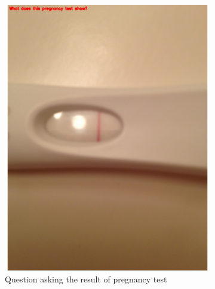 \documentclass[sigconf]{acmart}
\begin{document}
\begin{figure}[hbp]
\begin{subfigure}[b]{0.3\columnwidth}
                \includegraphics[width=\textwidth]{images/health_2.pdf}
                \caption{Question asking the result of pregnancy test}
                \label{fig:preg}
        \end{subfigure}%
        \begin{subfigure}[b]{0.3\columnwidth}

\end{subfigure}
\end{figure}
\end{document}
